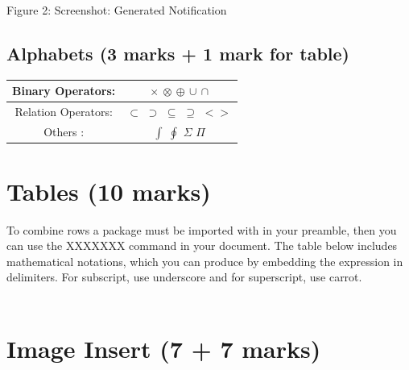 \documentclass[12pt]{article}
\newcommand{\comment}[1]{}
\begin{document}
\comment{
\begin{eqnarray*}
$cos^3θ + sin3
θ = (cosθ + sinθ)(cos2θ − cosθsinθ) (1)
= (cosθ + sinθ)(1 − cosθsinθ) (2)
= (cosθ + sinθ)(1/2)(2 − 2cosθsinθ)(3) (3)
= (1/2)(cosθ + sinθ)(2 − sin(2θ)) (4)$
}
Figure 2: Screenshot: Generated Notification


\subsection{Alphabets (3 marks + 1 mark for table)}
\medskip
\begin{center}

\begin{tabular}{ |c|c| }
\hline
Binary Operators: & $\times$   $\otimes$   $\oplus$   $\cup$   $\cap$  \\ [3 ex]
\hline
Relation Operators: & $\subset$   $\supset$    $\subseteq$    $\supseteq$    $< >$ \\ [3 ex]
\hline
Others : & $\int$   $\oint$    $\Sigma$    $\Pi$ \\ [3 ex]
\hline
\end{tabular}
\end{center}






\newpage



\section{Tables (10 marks)}
\indent
To combine rows a package must be imported with in your preamble, then you
can use the XXXXXXX command in your document. The table below includes
mathematical notations, which you can produce by embedding the expression
in $ $ delimiters. For subscript, use underscore and for superscript, use carrot. \\ \\
\newpage

\section{Image Insert (7 + 7 marks)}
\end{document}
